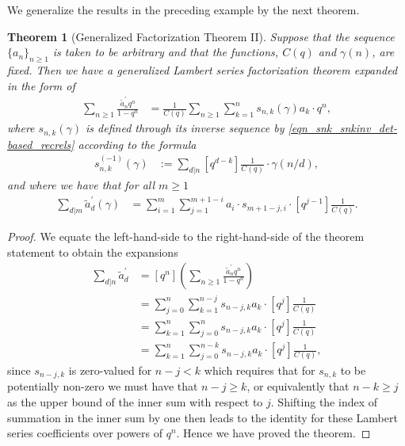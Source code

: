 \documentclass[10pt,reqno]{amsart}
\numberwithin{figure}{section}
\numberwithin{table}{section}
\theoremstyle{plain}
\newtheorem{theorem}{Theorem}
\numberwithin{theorem}{section}
\theoremstyle{remark}
\begin{document}
We generalize the results in the preceding example by the next theorem. 

\begin{theorem}[Generalized Factorization Theorem II] 
\label{theorem_GenLSFactThm_vII}
Suppose that the sequence $\{a_n\}_{n \geq 1}$ is taken to be arbitrary and that the functions, 
$C(q)$ and $\gamma(n)$, are fixed. Then we have a generalized Lambert series factorization 
theorem expanded in the form of 
\begin{align*} 
\sum_{n \geq 1} \frac{\widetilde{a}^{\prime}_n q^n}{1-q^n} & = \frac{1}{C(q)} \sum_{n \geq 1} \sum_{k=1}^n 
     s_{n,k}(\gamma) a_k \cdot q^n, 
\end{align*} 
where $s_{n,k}(\gamma)$ is defined through its inverse sequence by 
\eqref{eqn_snk_snkinv_det-based_recrels} according to the formula 
\begin{align*} 
s_{n,k}^{(-1)}(\gamma) & := \sum_{d|n} [q^{d-k}] \frac{1}{C(q)} \cdot \gamma(n/d), 
\end{align*} 
and where we have that for all $m \geq 1$
\begin{align*} 
\sum_{d|m} \widetilde{a}_d^{\prime}(\gamma) & = \sum_{i=1}^m \sum_{j=1}^{m+1-i} 
     a_i \cdot s_{m+1-j,i} \cdot [q^{j-1}] \frac{1}{C(q)}. 
\end{align*} 
\end{theorem} 
\begin{proof} 
We equate the left-hand-side to the right-hand-side of the theorem statement to obtain the 
expansions 
\begin{align*} 
\sum_{d|n} \widetilde{a}^{\prime}_d & = [q^n]\left(\sum_{n \geq 1} \frac{\widetilde{a}^{\prime}_n q^n}{1-q^n}\right) \\ 
     & = 
     \sum_{j=0}^n \sum_{k=1}^{n-j} s_{n-j,k} a_k \cdot [q^j] \frac{1}{C(q)} \\ 
     & = 
     \sum_{k=1}^n \sum_{j=0}^n s_{n-j,k} a_k \cdot [q^j] \frac{1}{C(q)} \\ 
     & = 
     \sum_{k=1}^n \sum_{j=0}^{n-k} s_{n-j,k} a_k \cdot [q^j] \frac{1}{C(q)}, 
\end{align*} 
since $s_{n-j,k}$ is zero-valued for $n-j < k$ which requires that for $s_{n,k}$ to be 
potentially non-zero we must have that $n-j \geq k$, or equivalently that 
$n-k \geq j$ as the upper bound of the inner sum with respect to $j$. 
Shifting the index of summation in the inner sum by one then leads to the identity for these 
Lambert series coefficients over powers of $q^n$. Hence we have proved the theorem. 
\end{proof}
\end{document}
